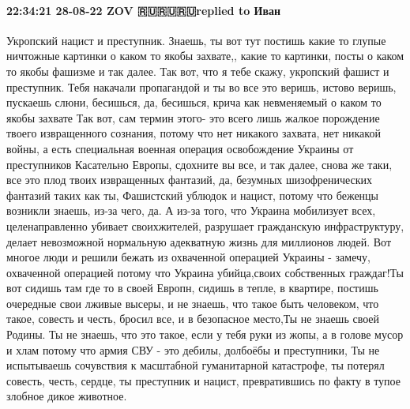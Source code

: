  
 
 
 
 

\paragraph{22:34:21 28-08-22 ZOV 🇷🇺🇷🇺🇷🇺replied to Иван}

Укропский нацист и преступник. Знаешь, ты вот тут постишь какие то глупые ничтожные
картинки о каком то якобы захвате,, какие то картинки, посты о каком то якобы
фашизме и так далее. Так вот, что я тебе скажу, укропский фашист и преступник. Тебя
накачали пропагандой и ты во все это веришь, истово веришь, пускаешь слюни, бесишься,
да, бесишься, крича как невменяемый о каком то якобы захвате Так вот, сам термин
этого- это всего лишь жалкое порождение твоего извращенного сознания, потому что
нет никакого захвата, нет никакой войны, а есть специальная военная операция
освобождение Украины от преступников Касательно Европы, сдохните вы все, и так далее, снова же таки, все это плод
твоих извращенных фантазий, да, безумных шизофренических фантазий таких
как ты, Фашистский ублюдок и нацист, потому что беженцы возникли знаешь,
из-за чего, да. А из-за того, что Украина мобилизует всех,
целенаправленно убивает своихжителей, разрушает гражданскую инфраструктуру,
делает невозможной нормальную адекватную жизнь для миллионов людей. Вот многое
люди и решили бежать из охваченной операцией Украины - замечу, охваченной операцией
потому что Украина убийца,своих собственных граждаг!Ты вот сидишь там где
то в своей Европн, сидишь в тепле, в квартире, постишь очередные свои
лживые высеры, и не знаешь, что такое быть человеком, что такое, совесть и честь, бросил все, и в безопасное место,Ты не знаешь своей
Родины. Ты не знаешь, что это такое, если у тебя руки из жопы, а в голове мусор и хлам
потому что армия СВУ - это дебилы, долбоёбы и преступники, Ты не испытываешь
сочувствия к масштабной гуманитарной катастрофе, ты потерял совесть, честь, сердце,
ты преступник и нацист, превратившись по факту в тупое злобное дикое
животное.
